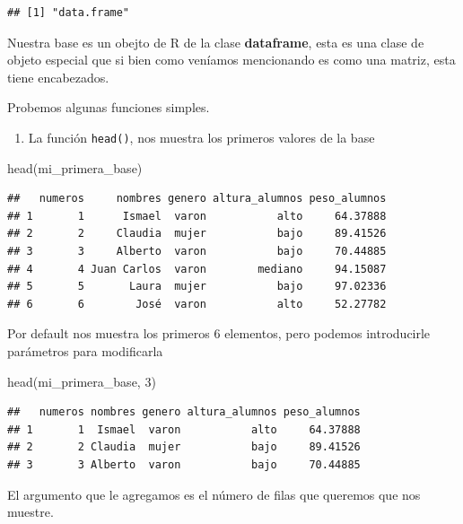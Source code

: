 \documentclass[
]{book}
\newenvironment{Shaded}{\begin{snugshade}}{\end{snugshade}}
\newcommand{\DecValTok}[1]{\textcolor[rgb]{0.00,0.00,0.81}{#1}}
\newcommand{\FunctionTok}[1]{\textcolor[rgb]{0.00,0.00,0.00}{#1}}
\newcommand{\NormalTok}[1]{#1}
\providecommand{\tightlist}{%
  \setlength{\itemsep}{0pt}\setlength{\parskip}{0pt}}
\begin{document}
\begin{verbatim}
## [1] "data.frame"
\end{verbatim}

Nuestra base es un obejto de R de la clase \textbf{dataframe}, esta es una clase de objeto especial que si bien como veníamos mencionando es como una matriz, esta tiene encabezados.

Probemos algunas funciones simples.

\begin{enumerate}
\def\labelenumi{\arabic{enumi}.}
\tightlist
\item
  La función \texttt{head()}, nos muestra los primeros valores de la base
\end{enumerate}

\begin{Shaded}
\begin{Highlighting}[]
\FunctionTok{head}\NormalTok{(mi\_primera\_base)}
\end{Highlighting}
\end{Shaded}

\begin{verbatim}
##   numeros     nombres genero altura_alumnos peso_alumnos
## 1       1      Ismael  varon           alto     64.37888
## 2       2     Claudia  mujer           bajo     89.41526
## 3       3     Alberto  varon           bajo     70.44885
## 4       4 Juan Carlos  varon        mediano     94.15087
## 5       5       Laura  mujer           bajo     97.02336
## 6       6        José  varon           alto     52.27782
\end{verbatim}

Por default nos muestra los primeros 6 elementos, pero podemos introducirle parámetros para modificarla

\begin{Shaded}
\begin{Highlighting}[]
\FunctionTok{head}\NormalTok{(mi\_primera\_base, }\DecValTok{3}\NormalTok{)}
\end{Highlighting}
\end{Shaded}

\begin{verbatim}
##   numeros nombres genero altura_alumnos peso_alumnos
## 1       1  Ismael  varon           alto     64.37888
## 2       2 Claudia  mujer           bajo     89.41526
## 3       3 Alberto  varon           bajo     70.44885
\end{verbatim}

El argumento que le agregamos es el número de filas que queremos que nos muestre.
\end{document}
